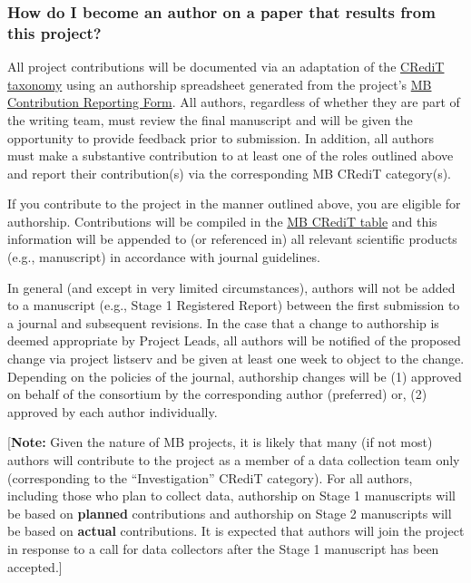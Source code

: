 \documentclass[
  letterpaper,
  DIV=11,
  numbers=noendperiod,
  oneside]{scrreprt}
\begin{document}

\subsubsection{How do I become an author on a paper that results from
this
project?}\label{how-do-i-become-an-author-on-a-paper-that-results-from-this-project}

All project contributions will be documented via an adaptation of the
\href{https://credit.niso.org/}{CRediT taxonomy} using an authorship
spreadsheet generated from the project's \href{manybabies.org/credit}{MB
Contribution Reporting Form}. All authors, regardless of whether they
are part of the writing team, must review the final manuscript and will
be given the opportunity to provide feedback prior to submission. In
addition, all authors must make a substantive contribution to at least
one of the roles outlined above and report their contribution(s) via the
corresponding MB CRediT category(s).

If you contribute to the project in the manner outlined above, you are
eligible for authorship. Contributions will be compiled in the
\href{https://manybabies.org/credit/}{MB CRediT table} and this
information will be appended to (or referenced in) all relevant
scientific products (e.g., manuscript) in accordance with journal
guidelines.

In general (and except in very limited circumstances), authors will not
be added to a manuscript (e.g., Stage 1 Registered Report) between the
first submission to a journal and subsequent revisions. In the case that
a change to authorship is deemed appropriate by Project Leads, all
authors will be notified of the proposed change via project listserv and
be given at least one week to object to the change. Depending on the
policies of the journal, authorship changes will be (1) approved on
behalf of the consortium by the corresponding author (preferred) or, (2)
approved by each author individually.

{[}\textbf{Note:} Given the nature of MB projects, it is likely that
many (if not most) authors will contribute to the project as a member of
a data collection team only (corresponding to the ``Investigation''
CRediT category). For all authors, including those who plan to collect
data, authorship on Stage 1 manuscripts will be based on
\textbf{planned} contributions and authorship on Stage 2 manuscripts
will be based on \textbf{actual} contributions. It is expected that
authors will join the project in response to a call for data collectors
after the Stage 1 manuscript has been accepted.{]}
\end{document}
